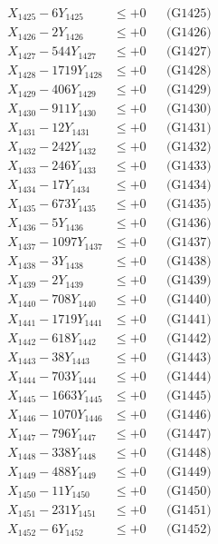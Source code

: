 \documentclass[a4paper,10pt]{article}
\begin{document}
{\begin{align}
X_{1425} - 6Y_{1425} &\leq +0 && \text{(G1425)} \\
X_{1426} - 2Y_{1426} &\leq +0 && \text{(G1426)} \\
X_{1427} - 544Y_{1427} &\leq +0 && \text{(G1427)} \\
X_{1428} - 1719Y_{1428} &\leq +0 && \text{(G1428)} \\
X_{1429} - 406Y_{1429} &\leq +0 && \text{(G1429)} \\
X_{1430} - 911Y_{1430} &\leq +0 && \text{(G1430)} \\
\allowbreak
X_{1431} - 12Y_{1431} &\leq +0 && \text{(G1431)} \\
X_{1432} - 242Y_{1432} &\leq +0 && \text{(G1432)} \\
X_{1433} - 246Y_{1433} &\leq +0 && \text{(G1433)} \\
X_{1434} - 17Y_{1434} &\leq +0 && \text{(G1434)} \\
X_{1435} - 673Y_{1435} &\leq +0 && \text{(G1435)} \\
X_{1436} - 5Y_{1436} &\leq +0 && \text{(G1436)} \\
X_{1437} - 1097Y_{1437} &\leq +0 && \text{(G1437)} \\
X_{1438} - 3Y_{1438} &\leq +0 && \text{(G1438)} \\
X_{1439} - 2Y_{1439} &\leq +0 && \text{(G1439)} \\
X_{1440} - 708Y_{1440} &\leq +0 && \text{(G1440)} \\
\allowbreak
X_{1441} - 1719Y_{1441} &\leq +0 && \text{(G1441)} \\
X_{1442} - 618Y_{1442} &\leq +0 && \text{(G1442)} \\
X_{1443} - 38Y_{1443} &\leq +0 && \text{(G1443)} \\
X_{1444} - 703Y_{1444} &\leq +0 && \text{(G1444)} \\
X_{1445} - 1663Y_{1445} &\leq +0 && \text{(G1445)} \\
X_{1446} - 1070Y_{1446} &\leq +0 && \text{(G1446)} \\
X_{1447} - 796Y_{1447} &\leq +0 && \text{(G1447)} \\
X_{1448} - 338Y_{1448} &\leq +0 && \text{(G1448)} \\
X_{1449} - 488Y_{1449} &\leq +0 && \text{(G1449)} \\
X_{1450} - 11Y_{1450} &\leq +0 && \text{(G1450)} \\
\allowbreak
X_{1451} - 231Y_{1451} &\leq +0 && \text{(G1451)} \\
X_{1452} - 6Y_{1452} &\leq +0 && \text{(G1452)} \\

\end{align}}
\end{document}

